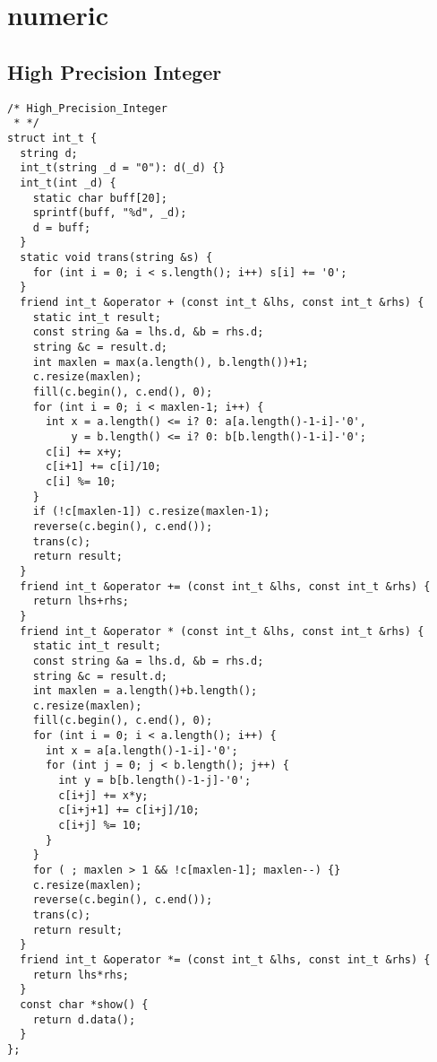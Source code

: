 \section{numeric}

\subsection{High Precision Integer}
\begin{lstlisting}
/* High_Precision_Integer
 * */
struct int_t {
  string d;
  int_t(string _d = "0"): d(_d) {}
  int_t(int _d) {
    static char buff[20];
    sprintf(buff, "%d", _d);
    d = buff;
  }
  static void trans(string &s) {
    for (int i = 0; i < s.length(); i++) s[i] += '0';
  }
  friend int_t &operator + (const int_t &lhs, const int_t &rhs) {
    static int_t result;
    const string &a = lhs.d, &b = rhs.d;
    string &c = result.d;
    int maxlen = max(a.length(), b.length())+1;
    c.resize(maxlen);
    fill(c.begin(), c.end(), 0);
    for (int i = 0; i < maxlen-1; i++) {
      int x = a.length() <= i? 0: a[a.length()-1-i]-'0',
          y = b.length() <= i? 0: b[b.length()-1-i]-'0';
      c[i] += x+y;
      c[i+1] += c[i]/10;
      c[i] %= 10;
    }
    if (!c[maxlen-1]) c.resize(maxlen-1);
    reverse(c.begin(), c.end());
    trans(c);
    return result;
  }
  friend int_t &operator += (const int_t &lhs, const int_t &rhs) {
    return lhs+rhs;
  }
  friend int_t &operator * (const int_t &lhs, const int_t &rhs) {
    static int_t result;
    const string &a = lhs.d, &b = rhs.d;
    string &c = result.d;
    int maxlen = a.length()+b.length();
    c.resize(maxlen);
    fill(c.begin(), c.end(), 0);
    for (int i = 0; i < a.length(); i++) {
      int x = a[a.length()-1-i]-'0';
      for (int j = 0; j < b.length(); j++) {
        int y = b[b.length()-1-j]-'0';
        c[i+j] += x*y;
        c[i+j+1] += c[i+j]/10;
        c[i+j] %= 10;
      }
    }
    for ( ; maxlen > 1 && !c[maxlen-1]; maxlen--) {}
    c.resize(maxlen);
    reverse(c.begin(), c.end());
    trans(c);
    return result;
  }
  friend int_t &operator *= (const int_t &lhs, const int_t &rhs) {
    return lhs*rhs;
  }
  const char *show() {
    return d.data();
  }
};
\end{lstlisting}


